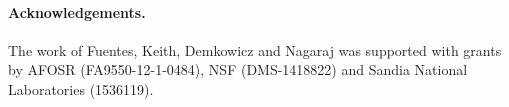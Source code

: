 

\paragraph{Acknowledgements.}
The work of Fuentes, Keith, Demkowicz and Nagaraj was supported with grants by AFOSR (FA9550-12-1-0484), NSF (DMS-1418822) and Sandia National Laboratories (1536119).